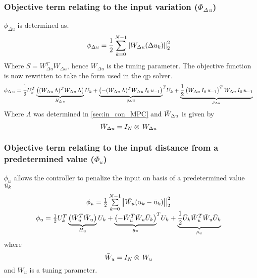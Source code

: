 \subsubsection*{Objective term relating to the input variation ($\Phi_{\Delta\,u}$)}
$\phi_{\Delta u}$ is determined as.
\begin{equation}
    \phi_{\Delta u}=\frac{1}{2}\,\overset{N-1}{\underset{k=0}{\sum}}\norm{W_{\Delta u}(\Delta u_k )}_2^2
\end{equation}
Where $S=W^T_{\Delta u}W_{\Delta u}$, hence $W_{\Delta u}$ is the tuning parameter. The objective function is now rewritten to take the form used in the qp solver.
\begin{equation}
    \phi_{\Delta\,u}=\frac{1}{2}U_k^T\underbrace{\left((\Bar{W}_{\Delta u}\,\Lambda)^T\Bar{W}_{\Delta u}\,\Lambda\right)}_{H_{\Delta\,u}}U_k+{\underbrace{\left(-(\Bar{W}_{\Delta u}\,\Lambda)^T\Bar{W}_{\Delta u}\,I_0\,u_{-1}\right)}_{g_\Delta u}}^TU_k+\underbrace{\frac{1}{2}\left(\Bar{W}_{\Delta u}\,I_0\,u_{-1}\right)^T\Bar{W}_{\Delta u}\,I_0\,u_{-1}}_{\rho_{\Delta u}}
\end{equation}
Where $\Lambda$ was determined in \cref{sec:in_con_MPC} and $\Bar{W}_{\Delta u}$ is given by
\begin{equation}
    \Bar{W}_{\Delta u}=I_N\otimes\,W_{\Delta u}
\end{equation}
\subsubsection*{Objective term relating to the input distance from a predetermined value ($\Phi_u$)}
$\phi_u$ allows the controller to penalize the input on basis of a predetermined value $\Bar{u}_k$
\begin{equation}
    \begin{matrix}
        \phi_u=\frac{1}{2}\, \overset{N-1}{\underset{k=0}{\sum}}\norm{\Bar{W_u}(u_k-\Bar{u}_k)}_2^2\\
        \phi_u=\frac{1}{2}U_k^T\underbrace{\left(\Bar{W}_u^T\Bar{W}_u\right)}_{H_u}U_k+{\underbrace{\left(-\Bar{W}_u^T\Bar{W}_u\Bar{U}_k\right)}_{g_u}}^TU_k+\underbrace{\frac{1}{2}\Bar{U}_k\Bar{W}_u^T\Bar{W}_u\Bar{U}_k}_{\rho_u}
    \end{matrix}
\end{equation}
where
\begin{equation}
    \Bar{W}_u=I_N\otimes\,W_u
\end{equation}
and $W_u$ is a tuning parameter.
